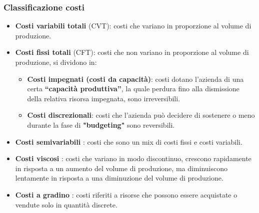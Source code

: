 \documentclass{article}
\begin{document}
\subsubsection*{Classificazione costi}
\begin{itemize}
    \item \textbf{Costi variabili totali} (CVT): costi che variano in proporzione al volume di produzione.
    \item \textbf{Costi fissi totali} (CFT): costi che non variano in proporzione al volume di produzione, si dividono in:
          \begin{itemize}
              \item \textbf{Costi impegnati (costi da capacità)}: costi  dotano l’azienda di una certa \textbf{“capacità produttiva”}, la quale perdura fino alla dismissione della relativa risorsa impegnata, sono irreversibili.
              \item \textbf{Costi discrezionali}: costi che l’azienda può decidere di sostenere o meno durante la fase di \textbf{"budgeting"} sono reversibili.
          \end{itemize}
    \item \textbf{Costi semivariabili} : costi che sono un mix di costi fissi e costi variabili.
    \item \textbf{Costi viscosi} : costi che variano in modo discontinuo, crescono rapidamente in risposta a un aumento del volume di produzione, ma diminuiscono lentamente in risposta a una diminuzione del volume di produzione.
    \item \textbf{Costi a gradino} : costi riferiti a risorse che possono essere acquistate o vendute solo in quantità discrete.
\end{itemize}
\end{document}
